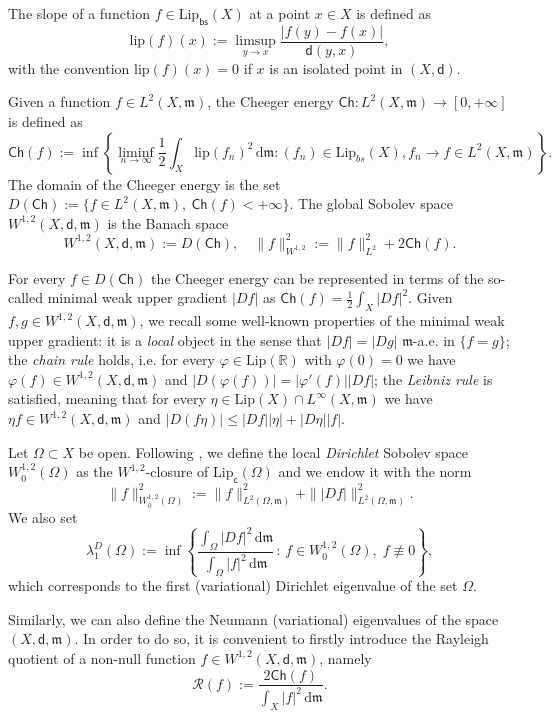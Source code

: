 \documentclass[12pt]{article}
\newcommand{\R}{\mathbb{R}}
\newcommand{\dd}{\mathrm{d}}
\newcommand{\Lip}{\mathrm{Lip}}
\newcommand{\lip}{\mathrm{lip}}
\newcommand{\mm}{\mathfrak m}
\newcommand{\di}{\mathsf{d}}
\newcommand{\Ch}{\mathsf{Ch}}
\theoremstyle{plain}
\theoremstyle{definition}
\begin{document}
The slope of a function $f\in \Lip_{\textsf{bs}}(X)$ at a point $x\in X$ is defined as
$$\lip(f)(x):=\limsup_{y\to x}\frac{|f(y)-f(x)|}{\di(y,x)},$$
with the convention $\lip(f)(x)=0$ if $x$ is an isolated point in $(X,\di)$.

Given a function $f\in L^2(X,\mm)$,  the Cheeger energy $\Ch:L^2(X,\mm)\to[0,+\infty]$ is defined as
$$\Ch(f):=\inf\left\{\liminf_{n\to\infty} \frac{1}{2}\int_X \lip(f_n)^2\,\dd \mm : (f_n)\in \Lip_{bs}(X), f_n\to f\in L^2(X,\mm)\right\}.$$
The domain of the Cheeger energy is the set $D(\Ch):=\{f\in L^2(X,\mm), \ \Ch(f)<+\infty\}$. The global Sobolev space $W^{1,2}(X,\di,\mm)$ is the Banach space
$$W^{1,2}(X,\di,\mm):=D(\Ch), \quad \|f\|^2_{W^{1,2}}:=\|f\|^2_{L^2}+2\Ch(f).$$

For every $f\in D(\Ch)$ the Cheeger energy can be represented in terms of the so-called minimal weak upper gradient $|Df|$ as $\Ch(f)=\frac{1}{2}\int_X |Df|^2$. Given $f,g\in W^{1,2}(X,\di,\mm)$, we recall some well-known properties of the minimal weak upper gradient: it is a \emph{local} object in the sense that $|Df|=|Dg|$ $\mm$-a.e. in $\{f=g\}$; the \emph{chain rule} holds, i.e. for every $\varphi\in \Lip(\R)$ with $\varphi(0)=0$ we have $\varphi(f)\in W^{1,2}(X,\di,\mm)$ and $|D(\varphi(f))|=|\varphi'(f)||Df|$; the \emph{Leibniz rule} is satisfied, meaning that for every $\eta\in \Lip(X)\cap L^{\infty}(X,\mm)$ we have $\eta f\in W^{1,2}(X,\di,\mm)$ and $|D(f\eta)|\le |Df||\eta|+|D\eta||f|$.

Let $\Omega\subset X$ be open. Following \cite{AH18}, we define the local \emph{Dirichlet} Sobolev space $W^{1,2}_0(\Omega)$ as the $W^{1,2}$-closure of $\Lip_{\textsf{c}}(\Omega)$ and we endow it with the norm 
\[\|f\|^2_{W^{1,2}_0(\Omega)}:=\|f\|^2_{L^2(\Omega,\mm)}+\||Df|\|^2_{L^2(\Omega,\mm)}.\]
We also set
\begin{equation}\label{eq: def lambda_1^D}
    \lambda_1^D(\Omega):=\inf\left\{\frac{\int_{\Omega}|Df|^2\,\dd \mm}{\int_{\Omega}|f|^2\,\dd \mm}\, : \, f\in W^{1,2}_0(\Omega), \; f\not\equiv 0\right\},
\end{equation}
which corresponds to the first (variational) Dirichlet eigenvalue of the set $\Omega$.

Similarly, we can also define the Neumann (variational) eigenvalues of the space $(X,\di,\mm)$. In order to do so, it is convenient to firstly introduce the Rayleigh quotient of a non-null function $f\in W^{1,2}(X,\di,\mm)$, namely
$$\mathcal{R}(f):=\frac{2\Ch(f)}{\int_X |f|^2\,\dd \mm}.$$
\end{document}
